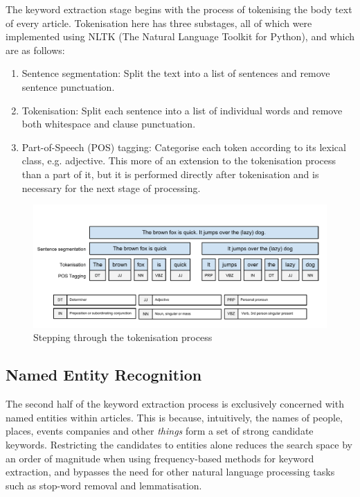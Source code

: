 The keyword extraction stage begins with the process of tokenising the body text of every article. Tokenisation here has three substages, all of which were implemented using NLTK (The Natural Language Toolkit for Python), and which are as follows:
\begin{enumerate}
	\item Sentence segmentation: Split the text into a list of sentences and remove sentence punctuation.
	\item Tokenisation: Split each sentence into a list of individual words and remove both whitespace and clause punctuation.
	\item Part-of-Speech (POS) tagging: Categorise each token according to its lexical class, e.g. adjective. This more of an extension to the tokenisation process than a part of it, but it is performed directly after tokenisation and is necessary for the next stage of processing.
\end{enumerate}
\begin{figure}[htbp!]
	\centering
	\includegraphics[width=\textwidth]{img/implementation/Tokenisation.pdf}
	\caption{Stepping through the tokenisation process}
	\label{fig:tokenisation}
\end{figure}

\subsection{Named Entity Recognition}

The second half of the keyword extraction process is exclusively concerned with named entities within articles. This is because, intuitively, the names of people, places, events companies and other \textit{things} form a set of strong candidate keywords. Restricting the candidates to entities alone reduces the search space by an order of magnitude when using frequency-based methods for keyword extraction, and bypasses the need for other natural language processing tasks such as stop-word removal and lemmatisation.

